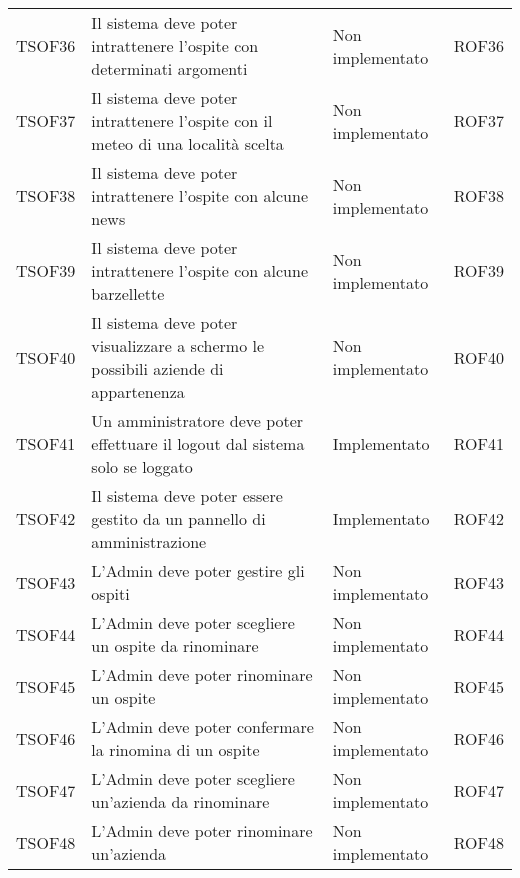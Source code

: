 \documentclass[../PianoDiQualifica_v3.0.0.tex]{subfiles}
\begin{document}
\begin{longtable}[c] { >{\centering\arraybackslash}p{2cm} p{7cm} >{\centering\arraybackslash}p{4cm} >{\centering\arraybackslash}p{2cm}}
			\addlinespace[0.3em]
			\midrule
			\addlinespace[0.3em]
			TSOF36 & Il sistema deve poter intrattenere l'ospite con determinati argomenti & Non implementato & ROF36 \\
			\addlinespace[0.3em]
			\midrule
			\addlinespace[0.3em]
			TSOF37 & Il sistema deve poter intrattenere l'ospite con il meteo di una località scelta & Non implementato & ROF37 \\
			\addlinespace[0.3em]
			\midrule
			\addlinespace[0.3em]
			TSOF38 & Il sistema deve poter intrattenere l'ospite con alcune news & Non implementato & ROF38 \\
			\addlinespace[0.3em]
			\midrule
			\addlinespace[0.3em]
			TSOF39 & Il sistema deve poter intrattenere l'ospite con alcune barzellette & Non implementato & ROF39 \\
			\addlinespace[0.3em]
			\midrule
			\addlinespace[0.3em]
			TSOF40 & Il sistema deve poter visualizzare a schermo le possibili aziende di appartenenza & Non implementato & ROF40 \\
			\addlinespace[0.3em]
			\midrule
			\addlinespace[0.3em]
			TSOF41 & Un amministratore deve poter effettuare il logout dal sistema solo se loggato	 & Implementato & ROF41 \\
			\addlinespace[0.3em]
			\midrule
			\addlinespace[0.3em]
			TSOF42 & Il sistema deve poter essere gestito da un pannello di amministrazione & Implementato & ROF42 \\
			\addlinespace[0.3em]
			\midrule
			\addlinespace[0.3em]
			TSOF43 & L'Admin deve poter gestire gli ospiti & Non implementato & ROF43 \\
			\addlinespace[0.3em]
			\midrule
			\addlinespace[0.3em]
			TSOF44 & L'Admin deve poter scegliere un ospite da rinominare & Non implementato & ROF44 \\
			\addlinespace[0.3em]
			\midrule
			\addlinespace[0.3em]
			TSOF45 & L'Admin deve poter rinominare un ospite & Non implementato & ROF45 \\
			\addlinespace[0.3em]
			\midrule
			\addlinespace[0.3em]
			TSOF46 & L'Admin deve poter confermare la rinomina di un ospite & Non implementato & ROF46 \\
			\addlinespace[0.3em]
			\midrule
			\addlinespace[0.3em]
			TSOF47 & L'Admin deve poter scegliere un'azienda da rinominare & Non implementato & ROF47 \\
			\addlinespace[0.3em]
			\midrule
			\addlinespace[0.3em]
			TSOF48 & L'Admin deve poter rinominare un'azienda & Non implementato & ROF48 \\

\end{longtable}
\end{document}
